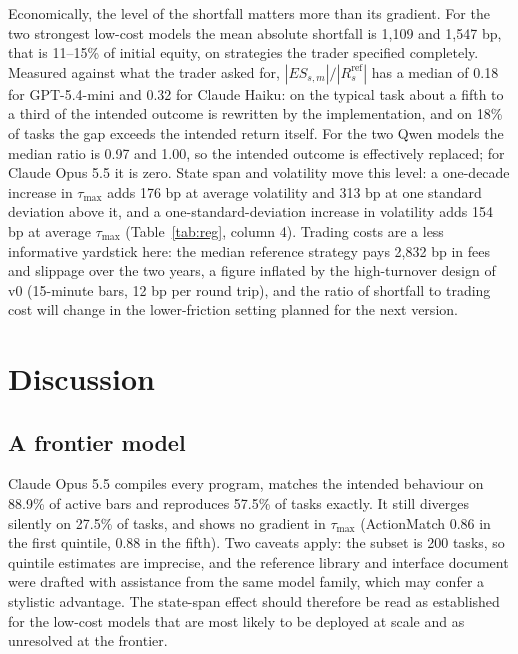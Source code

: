 \documentclass[a4paper,fleqn]{cas-sc}
\begin{document}
Economically, the level of the shortfall matters more than its gradient. For the two strongest low-cost models the mean absolute shortfall is 1{,}109 and 1{,}547 bp, that is 11--15\% of initial equity, on strategies the trader specified completely. Measured against what the trader asked for, $|ES_{s,m}|/|R^{\mathrm{ref}}_s|$ has a median of 0.18 for GPT-5.4-mini and 0.32 for Claude Haiku: on the typical task about a fifth to a third of the intended outcome is rewritten by the implementation, and on 18\% of tasks the gap exceeds the intended return itself. For the two Qwen models the median ratio is 0.97 and 1.00, so the intended outcome is effectively replaced; for Claude Opus 5.5 it is zero. State span and volatility move this level: a one-decade increase in $\tau_{\max}$ adds 176 bp at average volatility and 313 bp at one standard deviation above it, and a one-standard-deviation increase in volatility adds 154 bp at average $\tau_{\max}$ (Table~\ref{tab:reg}, column 4). Trading costs are a less informative yardstick here: the median reference strategy pays 2{,}832 bp in fees and slippage over the two years, a figure inflated by the high-turnover design of v0 (15-minute bars, 12 bp per round trip), and the ratio of shortfall to trading cost will change in the lower-friction setting planned for the next version.

\section{Discussion}

\subsection{A frontier model}

Claude Opus 5.5 compiles every program, matches the intended behaviour on 88.9\% of active bars and reproduces 57.5\% of tasks exactly. It still diverges silently on 27.5\% of tasks, and shows no gradient in $\tau_{\max}$ (ActionMatch 0.86 in the first quintile, 0.88 in the fifth). Two caveats apply: the subset is 200 tasks, so quintile estimates are imprecise, and the reference library and interface document were drafted with assistance from the same model family, which may confer a stylistic advantage. The state-span effect should therefore be read as established for the low-cost models that are most likely to be deployed at scale and as unresolved at the frontier.
\end{document}
